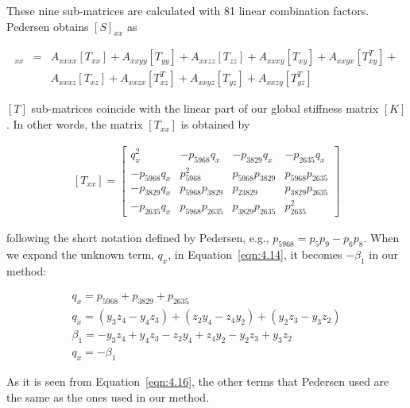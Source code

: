 \noindent These nine sub-matrices are calculated with 81 linear combination factors. Pedersen obtains $[S]_{xx}$ as

\begin{eqnarray}
[S]_{xx}
& = &
A_{xxxx}[T_{xx}] + A_{xxyy}[T_{yy}] + A_{xxzz}[T_{zz}] + A_{xxxy}[T_{xy}] + A_{xxyx}[T_{xy}^{T}] + \nonumber \\
&  & A_{xxxz}[T_{xz}] + A_{xxzx}[T_{xz}^{T}] + A_{xxyz}[T_{yz}] + A_{xxzy}[T_{yz}^{T}]
\label{eqn:4.13}
\end{eqnarray}

\noindent $[T]$ sub-matrices coincide with the linear part of our global stiffness matrix $[K]$. In other words, the matrix $[T_{xx}]$ is obtained by

\begin{equation}
\begin{array}{l}
[T_{xx}]
=
\begin{bmatrix}
q_{x}^2 & -p_{5968}q_{x} & -p_{3829}q_{x} & -p_{2635}q_{x} \\
-p_{5968}q_{x} & p_{5968}^2 & p_{5968}p_{3829} & p_{5968}p_{2635} \\
-p_{3829}q_{x} & p_{5968}p_{3829} & p_{23829} & p_{3829}p_{2635} \\
-p_{2635}q_{x} & p_{5968}p_{2635} & p_{3829}p_{2635} & p_{2635}^2
\end{bmatrix}
\end{array}
\label{eqn:4.14}
\end{equation}

\noindent following the short notation defined by Pedersen, e.g., $p_{5968} = p_{5}p_{9} - p_{6}p_{8}$.
When we expand the unknown term, $q_{x}$, in Equation~\ref{eqn:4.14}, it becomes $-\beta_{1}$  in our method:

 \begin{equation}
\begin{array}{l}
q_{x} = p_{5968} + p_{3829} + p_{2635} \\
q_{x} = (y_{3}z_{4} - y_{4}z_{3}) + (z_{2}y_{4} - z_{4}y_{2}) + (y_{2}z_{3} - y_{3}z_{2}) \\
\beta_{1} =  -y_{3}z_{4} + y_{4}z_{3} - z_{2}y_{4} + z_{4}y_{2} - y_{2}z_{3} + y_{3}z_{2} \\
q_{x} = -\beta_{1}
\end{array}
\label{eqn:4.15}
\end{equation}

\noindent As it is seen from Equation~\ref{eqn:4.16}, the other terms that Pedersen used are the same as the ones used in our method.

